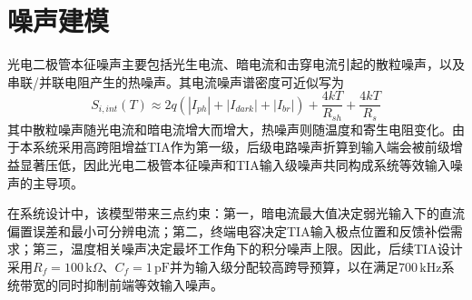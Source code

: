 \section{噪声建模}

光电二极管本征噪声主要包括光生电流、暗电流和击穿电流引起的散粒噪声，以及串联/并联电阻产生的热噪声。其电流噪声谱密度可近似写为
\begin{equation}
    S_{i,int}(T) \approx 2q\left(|I_{ph}|+|I_{dark}|+|I_{br}|\right)
    +\frac{4kT}{R_{sh}}+\frac{4kT}{R_s}
\end{equation}
其中散粒噪声随光电流和暗电流增大而增大，热噪声则随温度和寄生电阻变化。由于本系统采用高跨阻增益TIA作为第一级，后级电路噪声折算到输入端会被前级增益显著压低，因此光电二极管本征噪声和TIA输入级噪声共同构成系统等效输入噪声的主导项。

在系统设计中，该模型带来三点约束：第一，暗电流最大值决定弱光输入下的直流偏置误差和最小可分辨电流；第二，终端电容决定TIA输入极点位置和反馈补偿需求；第三，温度相关噪声决定最坏工作角下的积分噪声上限。因此，后续TIA设计采用$R_f=100\,\text{k}\Omega$、$C_f=1\,\text{pF}$并为输入级分配较高跨导预算，以在满足$700\,\text{kHz}$系统带宽的同时抑制前端等效输入噪声。
